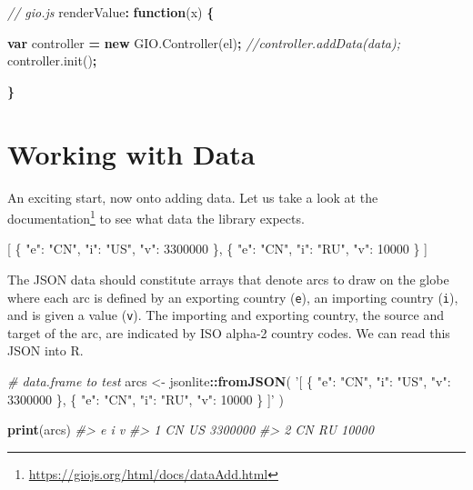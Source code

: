 \documentclass[10pt,]{krantz}
\makeatletter
\newenvironment{Shaded}{\begin{snugshade}}{\end{snugshade}}
\newcommand{\AttributeTok}[1]{\textcolor[rgb]{0.61,0.61,0.61}{#1}}
\newcommand{\CommentTok}[1]{\textcolor[rgb]{0.37,0.37,0.37}{\textit{#1}}}
\newcommand{\DataTypeTok}[1]{\textcolor[rgb]{0.27,0.27,0.27}{#1}}
\newcommand{\DecValTok}[1]{\textcolor[rgb]{0.06,0.06,0.06}{#1}}
\newcommand{\FunctionTok}[1]{\textcolor[rgb]{0,0,0}{#1}}
\newcommand{\KeywordTok}[1]{\textcolor[rgb]{0.27,0.27,0.27}{\textbf{#1}}}
\newcommand{\NormalTok}[1]{#1}
\newcommand{\OperatorTok}[1]{\textcolor[rgb]{0.43,0.43,0.43}{\textbf{#1}}}
\newcommand{\OtherTok}[1]{\textcolor[rgb]{0.37,0.37,0.37}{#1}}
\newcommand{\StringTok}[1]{\textcolor[rgb]{0.5,0.5,0.5}{#1}}
\newcommand{\VariableTok}[1]{\textcolor[rgb]{0,0,0}{#1}}
\renewcommand{\href}[2]{#2\footnote{\url{#1}}}
\newenvironment{kframe}{%
\medskip{}
\setlength{\fboxsep}{.8em}
 \def\at@end@of@kframe{}%
 \ifinner\ifhmode%
  \def\at@end@of@kframe{\end{minipage}}%
  \begin{minipage}{\columnwidth}%
 \fi\fi%
 \def\FrameCommand##1{\hskip\@totalleftmargin \hskip-\fboxsep
 \colorbox{shadecolor}{##1}\hskip-\fboxsep
     \hskip-\linewidth \hskip-\@totalleftmargin \hskip\columnwidth}%
 \MakeFramed {\advance\hsize-\width
   \@totalleftmargin\z@ \linewidth\hsize
   \@setminipage}}%
 {\par\unskip\endMakeFramed%
 \at@end@of@kframe}
\renewenvironment{Shaded}{\begin{kframe}}{\end{kframe}}
\makeatother
\begin{document}
\begin{Shaded}
\begin{Highlighting}[]
\CommentTok{// gio.js}
\NormalTok{renderValue}\OperatorTok{:} \KeywordTok{function}\NormalTok{(x) }\OperatorTok{\{}

  \KeywordTok{var}\NormalTok{ controller }\OperatorTok{=} \KeywordTok{new} \VariableTok{GIO}\NormalTok{.}\AttributeTok{Controller}\NormalTok{(el)}\OperatorTok{;}
  \CommentTok{//controller.addData(data);}
  \VariableTok{controller}\NormalTok{.}\AttributeTok{init}\NormalTok{()}\OperatorTok{;}

\OperatorTok{\}}
\end{Highlighting}
\end{Shaded}

\hypertarget{widgets-full-data}{%
\section{Working with Data}\label{widgets-full-data}}

An exciting start, now onto adding data. Let us take a look at the \href{https://giojs.org/html/docs/dataAdd.html}{documentation} to see what data the library expects.

\begin{Shaded}
\begin{Highlighting}[]
\OtherTok{[}
  \FunctionTok{\{}
    \DataTypeTok{"e"}\FunctionTok{:} \StringTok{"CN"}\FunctionTok{,}
    \DataTypeTok{"i"}\FunctionTok{:} \StringTok{"US"}\FunctionTok{,}
    \DataTypeTok{"v"}\FunctionTok{:} \DecValTok{3300000}
  \FunctionTok{\}}\OtherTok{,}
  \FunctionTok{\{}
    \DataTypeTok{"e"}\FunctionTok{:} \StringTok{"CN"}\FunctionTok{,}
    \DataTypeTok{"i"}\FunctionTok{:} \StringTok{"RU"}\FunctionTok{,}
    \DataTypeTok{"v"}\FunctionTok{:} \DecValTok{10000}
  \FunctionTok{\}}
\OtherTok{]}
\end{Highlighting}
\end{Shaded}

The JSON data should constitute arrays that denote arcs to draw on the globe where each arc is defined by an exporting country (\texttt{e}), an importing country (\texttt{i}), and is given a value (\texttt{v}). The importing and exporting country, the source and target of the arc, are indicated by ISO alpha-2 country codes. We can read this JSON into R.

\begin{Shaded}
\begin{Highlighting}[]
\CommentTok{# data.frame to test}
\NormalTok{arcs <-}\StringTok{ }\NormalTok{jsonlite}\OperatorTok{::}\KeywordTok{fromJSON}\NormalTok{(}
  \StringTok{'[}
\StringTok{    \{}
\StringTok{      "e": "CN",}
\StringTok{      "i": "US",}
\StringTok{      "v": 3300000}
\StringTok{    \},}
\StringTok{    \{}
\StringTok{      "e": "CN",}
\StringTok{      "i": "RU",}
\StringTok{      "v": 10000}
\StringTok{    \}}
\StringTok{  ]'}
\NormalTok{)}

\KeywordTok{print}\NormalTok{(arcs)}
\CommentTok{#>    e  i       v}
\CommentTok{#> 1 CN US 3300000}
\CommentTok{#> 2 CN RU   10000}
\end{Highlighting}
\end{Shaded}
\end{document}
